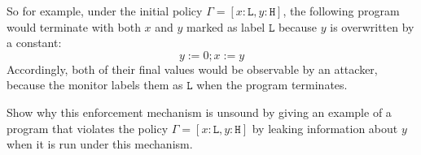 \documentclass[10pt]{article}
\begin{document}
\begin{enumerate}
So for example, under the initial policy $\Gamma = [x : \mathtt{L}, y : \mathtt{H}]$, the following program would terminate with both $x$ and $y$ marked as label $\mathtt{L}$ because $y$ is overwritten by a constant:
\[
y := 0; x := y
\]
Accordingly, both of their final values would be observable by an attacker, because the monitor labels them as $\mathtt{L}$ when the program terminates.

\noindent
Show why this enforcement mechanism is unsound by giving an example of a program that violates the policy $\Gamma = [x : \mathtt{L}, y : \mathtt{H}]$ by leaking information about $y$ when it is run under this mechanism.


\end{enumerate}
\end{document}
